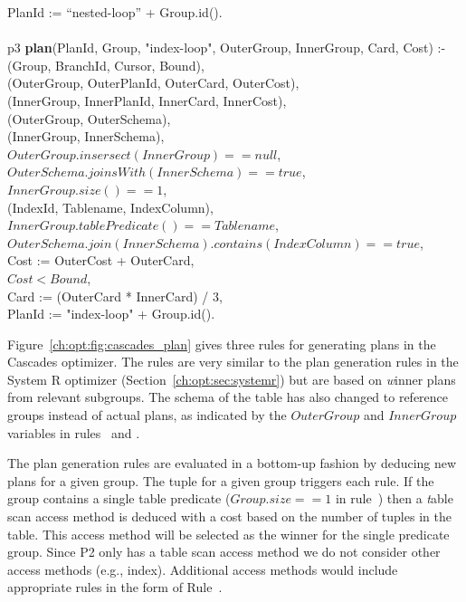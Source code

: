 \begin{figure*}
\begin{boxedminipage}{\linewidth}
\datalogspace PlanId := ``nested-loop'' + Group.id(). \\
\\
p3 {\bf plan}(PlanId, Group, "index-loop", OuterGroup, InnerGroup, Card, Cost) :- \\
(Group, BranchId, Cursor, Bound), \\
(OuterGroup, OuterPlanId, OuterCard, OuterCost), \\
(InnerGroup, InnerPlanId, InnerCard, InnerCost), \\
(OuterGroup, OuterSchema), \\
(InnerGroup, InnerSchema), \\
\datalogspace $OuterGroup.insersect(InnerGroup) ==  null$, \\
\datalogspace $OuterSchema.joinsWith(InnerSchema) ==  true$, \\
\datalogspace $InnerGroup.size() == 1$, \\
(IndexId, Tablename, IndexColumn), \\
\datalogspace $InnerGroup.tablePredicate() == Tablename$, \\
\datalogspace $OuterSchema.join(InnerSchema).contains(IndexColumn) ==  true$, \\
\datalogspace Cost := OuterCost + OuterCard, \\
\datalogspace $Cost < Bound$, \\
\datalogspace Card := (OuterCard * InnerCard) / 3, \\ 
\datalogspace PlanId := "index-loop" + Group.id(). \\
  
\end{boxedminipage}
\caption{\label{ch:opt:fig:cascades_plan} Cascades plan generation rules.}
\end{figure*}

Figure~\ref{ch:opt:fig:cascades_plan} gives three rules for generating plans
in the Cascades optimizer.  The rules are very similar to the plan generation
rules in the System R optimizer (Section~\ref{ch:opt:sec:systemr}) but are based on
{\emph winner} plans from relevant subgroups.  The schema of the 
table has also changed to reference groups instead of actual plans, as
indicated by the $OuterGroup$ and $InnerGroup$ variables in rules~ and
.

The plan generation rules are evaluated in a bottom-up fashion by deducing new
plans for a given group.  The  tuple for a given group triggers
each rule.  If the group contains a single table predicate ($Group.size == 1$
in rule~) then a {\emph table scan} access method is deduced with a cost based
on the number of tuples in the table.  This access method will be selected as
the winner for the single predicate group.  Since P2 only has a table scan
access method we do not consider other access methods (e.g., index).
Additional access methods would include appropriate rules in the form of
Rule~.

